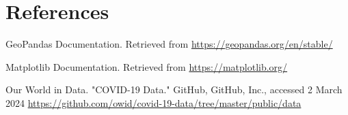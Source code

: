 \documentclass[fontsize=11pt]{article}
\begin{document}
\section{References}

\begin{thebibliography}{9}
GeoPandas Documentation. Retrieved from \url{https://geopandas.org/en/stable/}

Matplotlib Documentation. Retrieved from \url{https://matplotlib.org/}


Our World in Data. "COVID-19 Data." GitHub, GitHub, Inc., accessed 2 March 2024 \url{https://github.com/owid/covid-19-data/tree/master/public/data}
\end{thebibliography}
\end{document}
